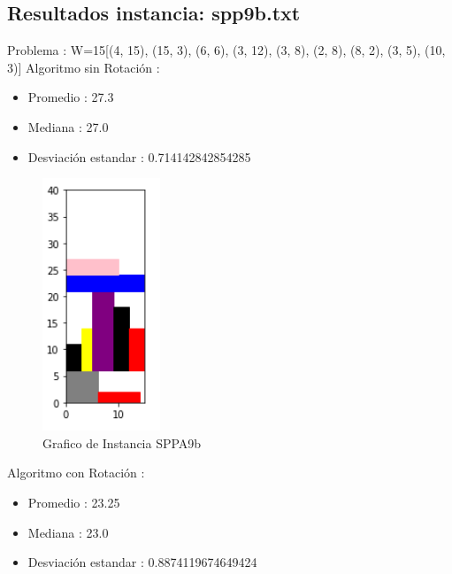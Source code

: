 \documentclass[10pt]{article}
\begin{document}
\subsection{Resultados instancia: spp9b.txt}%
\label{subsec:Resultadosinstanciaspp9b.txt}%
Problema : W=15{[}(4, 15), (15, 3), (6, 6), (3, 12), (3, 8), (2, 8), (8, 2), (3, 5), (10, 3){]} \newline%
%
 Algoritmo sin Rotación : %
\begin{itemize}%
\item%
Promedio : 27.3%
\item%
Mediana : 27.0%
\item%
Desviación estandar : 0.714142842854285%
\end{itemize}

\begin{figure}[H]
\centerline{\includegraphics[width=0.5\linewidth]{2_sin_rotar.jpg}}
\caption{Grafico de Instancia SPPA9b }
\label{fig_3}
\end{figure} 

%
Algoritmo con Rotación : %
\begin{itemize}%
\item%
Promedio : 23.25%
\item%
Mediana : 23.0%
\item%
Desviación estandar : 0.8874119674649424%
\end{itemize}%
\end{document}
